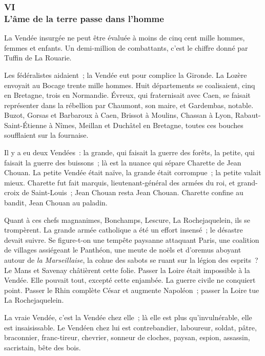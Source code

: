 \documentclass[french,twoside]{book} %
\begin{document}
 \subsubsection[{VI. L’âme de la terre passe dans l’homme}]{VI \\
L’âme de la terre passe dans l’homme}
\label{p3l1c6}
\noindent La Vendée insurgée ne peut être évaluée à moins de cinq cent mille hommes, femmes et enfants. Un demi-million de combattants, c’est le chiffre donné par Tuffin de La Rouarie.\par
Les fédéralistes aidaient ; la Vendée eut pour complice la Gironde. La Lozère envoyait au Bocage trente mille hommes. Huit départements se coalisaient, cinq en Bretagne, trois en Normandie. Évreux, qui fraternisait avec Caen, se faisait représenter dans la rébellion par Chaumont, son maire, et Gardembas, notable. Buzot, Gorsas et Barbaroux à Caen, Brissot à Moulins, Chassan à Lyon, Rabaut-Saint-Étienne à Nîmes, Meillan et Duchâtel en Bretagne, toutes ces bouches soufflaient sur la fournaise.\par
Il y a eu deux Vendées : la grande, qui faisait la guerre des forêts, la petite, qui faisait la guerre des buissons ; là est la nuance qui sépare Charette de Jean Chouan. La petite Vendée était naïve, la grande était corrompue ; la petite valait mieux. Charette fut fait marquis, lieutenant-général des armées du roi, et grand-croix de Saint-Louis ; Jean Chouan resta Jean Chouan. Charette confine au bandit, Jean Chouan au paladin.\par
Quant à ces chefs magnanimes, Bonchamps, Lescure,  La Rochejaquelein, ils se trompèrent. La grande armée catholique a été un effort insensé ; le désastre devait suivre. Se figure-t-on une tempête paysanne attaquant Paris, une coalition de villages assiégeant le Panthéon, une meute de noëls et d’oremus aboyant autour de \emph{la Marseillaise}, la cohue des sabots se ruant sur la légion des esprits ? Le Mans et Savenay châtièrent cette folie. Passer la Loire était impossible à la Vendée. Elle pouvait tout, excepté cette enjambée. La guerre civile ne conquiert point. Passer le Rhin complète César et augmente Napoléon ; passer la Loire tue La Rochejaquelein.\par
La vraie Vendée, c’est la Vendée chez elle ; là elle est plus qu’invulnérable, elle est insaisissable. Le Vendéen chez lui est contrebandier, laboureur, soldat, pâtre, braconnier, franc-tireur, chevrier, sonneur de cloches, paysan, espion, assassin, sacristain, bête des bois.\par
\end{document}
